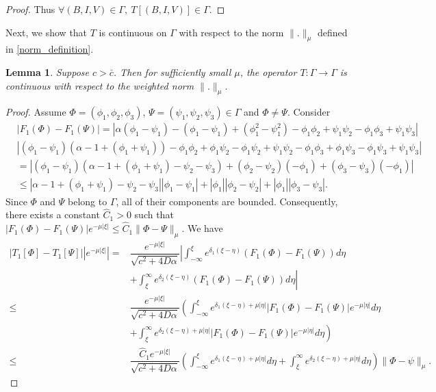 \documentclass[11pt]{article}
\newtheorem{lemma}[thm]{Lemma}
\theoremstyle{definition}
\begin{document}
{\begin{proof}
Thus $\forall (B,I, V) \in \Gamma, \ T[(B,I,V)] \in \Gamma$.
\end{proof}
\color{black}
Next, we show that $T$ is continuous on $\Gamma$ with respect to the norm $\|.\|_\mu $ defined in \eqref{norm_definition}.
\begin{lemma}
    Suppose $c > \bar{c}$. Then for sufficiently small $\mu $, the operator $T: \Gamma  \to \Gamma$ is continuous with respect to the weighted norm $\|.\|_\mu$. 
    \end{lemma}
    \begin{proof}
        Assume $\Phi= (\phi_1, \phi_2, \phi_3)$, $\Psi=(\psi_1, \psi_2, \psi_3) \in \Gamma$ and $\Phi \neq \Psi$. Consider \begin{align}
            &| F_1(\Phi)- F_1(\Psi)| = |\alpha (\phi_1-\psi_1)- (\phi_1-\psi_1)+(\phi_1^2- \psi_1^2) - \phi_1\phi_2+ \psi_1\psi_2- \phi_1\phi_3+ \psi_1\psi_3| \\ & |(\phi_1-\psi_1)(\alpha-1+(\phi_1+\psi_1))- \phi_1\phi_2+ \phi_1\psi_2-\phi_1\psi_2+\psi_1\psi_2- \phi_1\phi_3+ \phi_1\psi_3-\phi_1\psi_3+ \psi_1\psi_3 | \\&= |(\phi_1-\psi_1)(\alpha-1+(\phi_1+\psi_1)- \psi_2-\psi_3)+(\phi_2-\psi_2)(- \phi_1)+ (\phi_3-\psi_3)(-\phi_1)| \\ & \le |\alpha-1+(\phi_1+\psi_1)-\psi_2-\psi_3||\phi_1-\psi_1|+|\phi_1||\phi_2-\psi_2|+|\phi_1||\phi_3-\psi_3| .
        \end{align} 
Since $\Phi$ and $\Psi$ belong to $\Gamma$, all of their components are bounded. Consequently, there exists a constant $\widehat C_1>0$ such that
$|F_1(\Phi)- F_1(\Psi)|e^{-\mu|\xi|} \le \widehat C_1\|\Phi-\Psi\|_\mu$. We have \begin{align}
    |T_1[\Phi]-T_1[\Psi]||e^{- \mu |\xi|}|=& \dfrac{e^{-\mu |\xi|}}{\sqrt{c^2+ 4 D \alpha}}\left|\int_{- \infty}^{\xi}e^{\delta_1(\xi-\eta)}\left(F_1(\Phi)- F_1(\Psi)\right) d \eta \right. \\ & \left. 
 + \int_{\xi}^{\infty }e^{\delta_2(\xi-\eta)}\left(F_1(\Phi)- F_1(\Psi)\right) d \eta  \right| \\ \le& \dfrac{e^{-\mu |\xi|}}{\sqrt{c^2+ 4 D \alpha}}\left(\int_{- \infty}^{\xi}e^{\delta_1(\xi-\eta)+ \mu|\eta|}\left|F_1(\Phi)- F_1(\Psi)\right|e^{-\mu |\eta|} d \eta \right. \\ & \left.
 + \int_{\xi}^{\infty }e^{\delta_2(\xi-\eta)+ \mu|\eta|}\left|F_1(\Phi)- F_1(\Psi)\right|e^{-\mu |\eta|} d \eta  \right) \\ \leq& \dfrac{\widehat{C}_1 e^{-\mu |\xi|}}{\sqrt{c^2+ 4 D \alpha}}\left(\int_{- \infty}^{\xi}e^{\delta_1(\xi-\eta)+ \mu|\eta|} d \eta 
 + \int_{\xi}^{\infty }e^{\delta_2(\xi-\eta)+ \mu|\eta|} d \eta  \right)\|\Phi-\psi\|_\mu.
\end{align}


\end{proof}}
\end{document}
